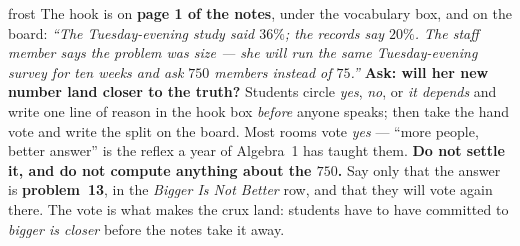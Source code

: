 \documentclass[10pt]{article}
\begin{document}
\boxguard
\begin{skillbox}{frost}
The hook is on \textbf{page 1 of the notes}, under the vocabulary box, and on the board:
\textit{``The Tuesday-evening study said $36\%$; the records say $20\%$. The staff member says
the problem was size --- she will run the same Tuesday-evening survey for ten weeks and ask
$750$ members instead of $75$.''} \textbf{Ask: will her new number land closer to the truth?}
Students circle \emph{yes}, \emph{no}, or \emph{it depends} and write one line of reason in the
hook box \emph{before} anyone speaks; then take the hand vote and write the split on the board.
Most rooms vote \emph{yes} --- ``more people, better answer'' is the reflex a year of Algebra~1
has taught them. \textbf{Do not settle it, and do not compute anything about the $750$.} Say
only that the answer is \textbf{problem~13}, in the \emph{Bigger Is Not Better} row, and that
they will vote again there. The vote is what makes the crux land: students have to have
committed to \emph{bigger is closer} before the notes take it away.
\end{skillbox}
\end{document}
